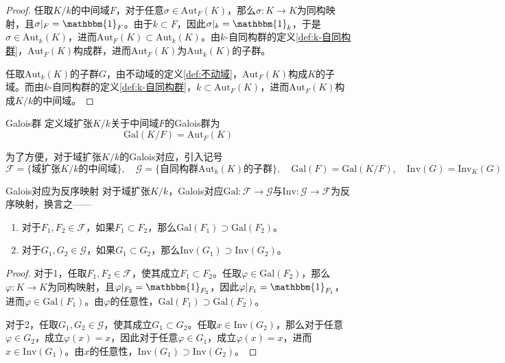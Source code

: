 \documentclass[lang = cn, scheme = chinese, thmcnt = section, usesamecnt]{elegantbook}
\newcommand{\sub}{\subset}             %
\newcommand{\Gal}{\mathrm{Gal}}
\newcommand{\Aut}{\mathrm{Aut}}
\newcommand{\Inv}{\mathrm{Inv}}
\begin{document}
\begin{proof}
	任取$K/k$的中间域$F$，对于任意$\sigma\in \Aut_F(K)$，那么$\sigma:K\to K$为同构映射，且$\sigma|_F=\mathbbm{1}_F$。由于$k\sub F$，因此$\sigma|_k=\mathbbm{1}_k$，于是$\sigma\in \Aut_k(K)$，进而$\Aut_F(K)\sub \Aut_k(K)$。由$k$-自同构群的定义\ref{def:k-自同构群}，$\Aut_F(K)$构成群，进而$\Aut_F(K)$为$\Aut_k(K)$的子群。
	
	任取$\text{Aut}_k(K)$的子群$G$，由不动域的定义\ref{def:不动域}，$\Aut_F(K)$构成$K$的子域。而由$k$-自同构群的定义\ref{def:k-自同构群}，$k\sub \Aut_F(K)$，进而$\Aut_F(K)$构成$K/k$的中间域。
\end{proof}

\begin{definition}{Galois群}
	定义域扩张$K/k$关于中间域$F$的Galois群为
	$$
	\Gal(K/F)=\Aut_F(K)
	$$
\end{definition}

\begin{remark}
	为了方便，对于域扩张$K/k$的Galois对应，引入记号%
	$$
	\mathscr{F}=\{ \text{域扩张}K/k\text{的中间域} \},\quad 
	\mathscr{G}=\{ \text{自同构群}\text{Aut}_k(K)\text{的子群} \},\quad
	\Gal(F)=\Gal(K/F),\quad
	\Inv(G)=\Inv_K(G)
	$$
\end{remark}

\begin{lemma}{}{Galois对应为反序映射}
	对于域扩张$K/k$，Galois对应$\Gal:\mathscr{F}\to \mathscr{G}$与$\Inv:\mathscr{G}\to \mathscr{F}$为反序映射，换言之——
	\begin{enumerate}
		\item 对于$F_1,F_2\in \mathscr{F}$，如果$F_1\sub F_2$，那么$\Gal(F_1)\supset \Gal(F_2)$。
		\item 对于$G_1,G_2\in \mathscr{G}$，如果$G_1\sub G_2$，那么$\Inv(G_1)\supset \Inv(G_2)$。
	\end{enumerate}
\end{lemma}

\begin{proof}
	对于1，任取$F_1,F_2\in \mathscr{F}$，使其成立$F_1\sub F_2$。任取$\varphi\in \Gal(F_2)$，那么$\varphi:K\to K$为同构映射，且$\varphi|_{F_2}=\mathbbm{1}_{F_2}$，因此$\varphi|_{F_1}=\mathbbm{1}_{F_1}$，进而$\varphi\in \Gal(F_1)$。由$\varphi$的任意性，$\Gal(F_1)\supset \Gal(F_2)$。
	
	对于2，任取$G_1,G_2\in \mathscr{G}$，使其成立$G_1\sub G_2$。任取$x\in \Inv(G_2)$，那么对于任意$\varphi\in G_2$，成立$\varphi(x)=x$，因此对于任意$\varphi\in G_1$，成立$\varphi(x)=x$，进而$x\in \Inv(G_1)$。由$x$的任意性，$\Inv(G_1)\supset \Inv(G_2)$。
\end{proof}
\end{document}
